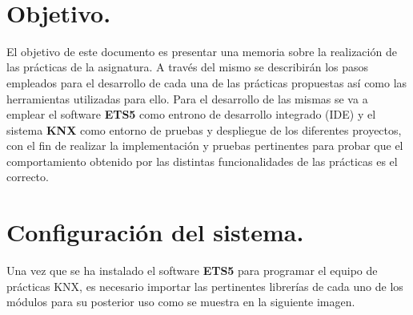 \documentclass[10pt]{article}
\begin{document}
\begin{center}
 		\\																		%
\vspace{2cm} 																				
\begin{center}																					

 			\end{center}												  						
\end{center}							 											
																					
\newpage																		

\tableofcontents 

\newpage

\section{Objetivo.}

El objetivo de este documento es presentar una memoria sobre la realización de las prácticas de la asignatura. A través del mismo se describirán los pasos empleados para el desarrollo de cada una de las prácticas propuestas así como las herramientas utilizadas para ello. Para el desarrollo de las mismas se va a emplear el software \textbf{ETS5} como entrono de desarrollo integrado (IDE) y el sistema \textbf{KNX} como entorno de pruebas y despliegue de los diferentes proyectos, con el fin de realizar la implementación y pruebas pertinentes para probar que el comportamiento obtenido por las distintas funcionalidades de las prácticas es el correcto. 


\section{Configuración del sistema.} 
Una vez que se ha instalado el software \textbf{ETS5} para programar el equipo de prácticas KNX, es necesario importar las pertinentes librerías de cada uno de los módulos para su posterior uso como se muestra en la siguiente imagen. \\
\end{document}
